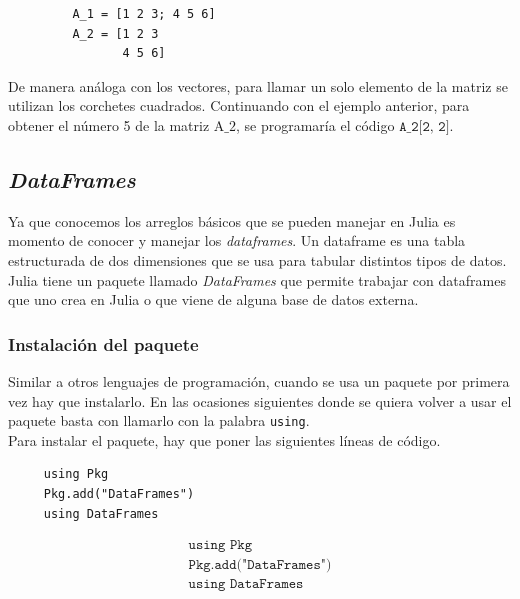 \begin{tcolorbox}
      \begin{verbatim}
         A_1 = [1 2 3; 4 5 6]
         A_2 = [1 2 3 
                4 5 6]
      \end{verbatim}
\end{tcolorbox}

De manera análoga con los vectores, para llamar un solo elemento de la matriz se utilizan los corchetes cuadrados. Continuando con el ejemplo anterior, para obtener el número 5 de la matriz $\text{A\_2}$, se programaría el código $\texttt{A\_2[2, 2]}$.



\subsection{\textit{DataFrames}}
Ya que conocemos los arreglos básicos que se pueden manejar en Julia es momento de conocer y manejar los \textit{dataframes}. Un dataframe es una tabla estructurada de dos dimensiones que se usa para tabular distintos tipos de datos. Julia tiene un paquete llamado \textit{DataFrames}  que permite trabajar con dataframes que uno crea en Julia o que viene de alguna base de datos externa. 

\subsubsection{Instalación del paquete}
Similar a otros lenguajes de programación, cuando se usa un paquete por primera vez hay que instalarlo. En las ocasiones siguientes donde se quiera volver a usar el paquete basta con llamarlo con la palabra \texttt{using}. 
\\
Para instalar el paquete, hay que poner las siguientes líneas de código. 

\begin{verbatim} 
     using Pkg
     Pkg.add("DataFrames")
     using DataFrames
\end{verbatim}


\begin{tcolorbox}
\begin{equation}
\begin{aligned} \label{instalacion_paquete}
       \texttt{using Pkg} \\
        \texttt{Pkg.add("DataFrames")} \\
        \texttt{using DataFrames}
\end{aligned}
\end{equation}
\end{tcolorbox}


